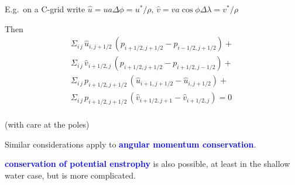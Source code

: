 \documentclass[a4]{seminar}
\newcommand{\B}[1]{\textcolor{blue}{#1}}
\begin{document}

\begin{slide}

E.g.\ on a C-grid write
\( \hat{u} = u a \Delta \phi = u^{\mathrm{*}} / \rho \),
\( \hat{v} = v  a \cos \phi \Delta \lambda = v^{\mathrm{*}} / \rho \)

Then
\begin{displaymath}
\begin{array}{l}
\Sigma_{i \, j} \, \hat{u}_{i,j+1/2} \,
\left( p_{i+1/2,j+1/2} - p_{i-1/2,j+1/2} \right) + \\
\Sigma_{i \, j} \, \hat{v}_{i+1/2,j} \,
\left( p_{i+1/2,j+1/2} - p_{i+1/2,j-1/2} \right) + \\
\Sigma_{i \, j} \, p_{i+1/2,j+1/2} \,
\left( \hat{u}_{i+1,j+1/2} - \hat{u}_{i,j+1/2} \right) + \\
\Sigma_{i \, j} \, p_{i+1/2,j+1/2} \,
\left( \hat{v}_{i+1/2,j+1} - \hat{v}_{i+1/2,j} \right) = 0 \\
\end{array}
\end{displaymath}

(with care at the poles)

\end{slide}


\begin{slide}

Similar considerations apply to \B{\bf angular momentum conservation}.

\vspace{6mm}

\B{\bf conservation of potential enstrophy} is also possible, at least
in the shallow water case, but is more complicated.



\end{slide}


\begin{slide}


\end{slide}


\begin{slide}



\end{slide}
\end{document}
